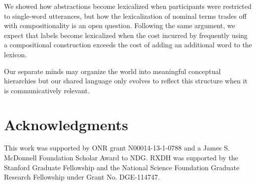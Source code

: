 \documentclass[10pt,letterpaper]{article}
\begin{document}

We showed how abstractions become lexicalized when participants were restricted to single-word utterances, but how the lexicalization of nominal terms trades off with compositionality is an open question. Following the same argument, we expect that labels become lexicalized when the cost incurred by frequently using a compositional construction exceeds the cost of adding an additional word to the lexicon. 

Our separate minds may organize the world into meaningful conceptual hierarchies but our shared language only evolves to reflect this structure when it is communicatively relevant. 


\section{\bf Acknowledgments}
\small
This work was supported by ONR grant N00014-13-1-0788 and a James S. McDonnell Foundation Scholar Award to NDG. RXDH was supported by the Stanford Graduate Fellowship and the National Science Foundation Graduate Research Fellowship under Grant No. DGE-114747.



\setlength{\bibleftmargin}{.125in}
\setlength{\bibindent}{-\bibleftmargin}


\end{document}
